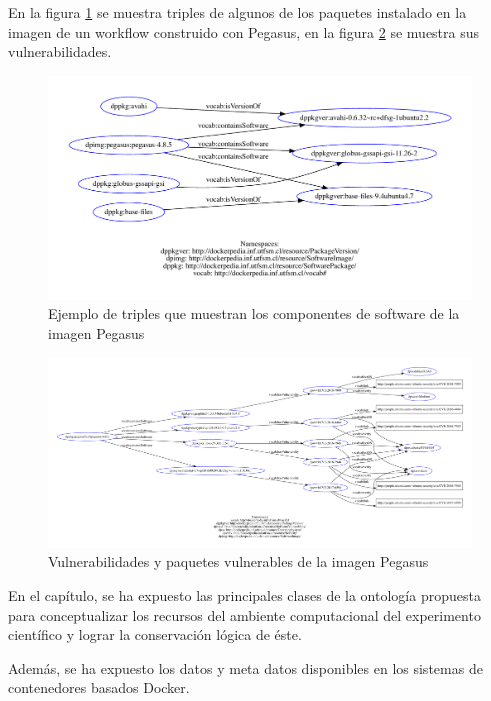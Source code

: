 En la figura  \ref{fig:packages-pegasus} se muestra triples de algunos de los paquetes instalado en la imagen de un workflow construido con Pegasus, en la figura \ref{fig:vulnerability-pegasus} se muestra sus vulnerabilidades.
\begin{figure}[hb]
    \includegraphics[width=\textwidth]{Figures/packages}
     \caption[Paquetes de la imagen Pegasus]{Ejemplo de triples que muestran los componentes de software de la imagen Pegasus}
    \label{fig:packages-pegasus}
\end{figure}

\begin{figure}[hb]
    \hspace*{-4cm}   
    \includegraphics[width=1.3\textwidth]{Figures/packages-vuln}
      \caption[Paquetes y vulnerabilidades de la imagen Pegasus]{Vulnerabilidades y paquetes vulnerables de la imagen Pegasus}
    \label{fig:vulnerability-pegasus}
\end{figure}

En el capítulo, se ha expuesto las principales clases de la ontología propuesta para conceptualizar los recursos del ambiente computacional del experimento científico y lograr la conservación lógica de éste.

Además, se ha expuesto los datos y meta datos disponibles en los sistemas de contenedores basados Docker. 

